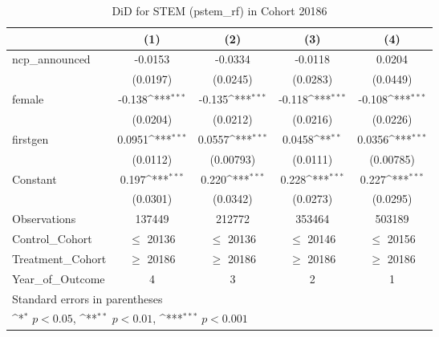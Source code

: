 \begin{table}[htbp]\centering
\def\sym#1{\ifmmode^{#1}\else\(^{#1}\)\fi}
\caption{DiD for STEM (pstem\_rf) in Cohort 20186}
\begin{tabular}{l*{4}{c}}
\toprule
                &\multicolumn{1}{c}{(1)}         &\multicolumn{1}{c}{(2)}         &\multicolumn{1}{c}{(3)}         &\multicolumn{1}{c}{(4)}         \\
\midrule
ncp\_announced   &  -0.0153         &  -0.0334         &  -0.0118         &   0.0204         \\
                & (0.0197)         & (0.0245)         & (0.0283)         & (0.0449)         \\
\addlinespace
female          &   -0.138\sym{***}&   -0.135\sym{***}&   -0.118\sym{***}&   -0.108\sym{***}\\
                & (0.0204)         & (0.0212)         & (0.0216)         & (0.0226)         \\
\addlinespace
firstgen        &   0.0951\sym{***}&   0.0557\sym{***}&   0.0458\sym{**} &   0.0356\sym{***}\\
                & (0.0112)         &(0.00793)         & (0.0111)         &(0.00785)         \\
\addlinespace
Constant        &    0.197\sym{***}&    0.220\sym{***}&    0.228\sym{***}&    0.227\sym{***}\\
                & (0.0301)         & (0.0342)         & (0.0273)         & (0.0295)         \\
\midrule
Observations    &   137449         &   212772         &   353464         &   503189         \\
Control\_Cohort  &$\le$ 20136         &$\le$ 20136         &$\le$ 20146         &$\le$ 20156         \\
Treatment\_Cohort&$\ge$ 20186         &$\ge$ 20186         &$\ge$ 20186         &$\ge$ 20186         \\
Year\_of\_Outcome &        4         &        3         &        2         &        1         \\
\bottomrule
\multicolumn{5}{l}{\footnotesize Standard errors in parentheses}\\
\multicolumn{5}{l}{\footnotesize \sym{*} \(p<0.05\), \sym{**} \(p<0.01\), \sym{***} \(p<0.001\)}\\
\end{tabular}
\end{table}
